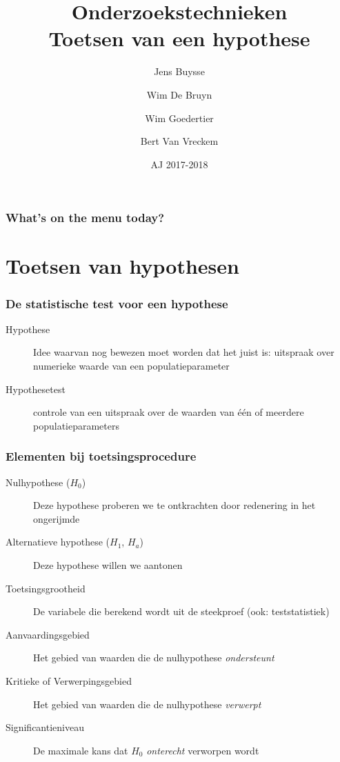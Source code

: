 \documentclass{beamer}
\title[Intro]{Onderzoekstechnieken\\Toetsen van een hypothese}
\author{Jens Buysse \and Wim {De Bruyn} \and Wim Goedertier \and Bert {Van Vreckem}}
\date{AJ 2017-2018}
\begin{document}

\HoGentLogo

\titleframe



\begin{frame}
  \frametitle{What's on the menu today?}

  \tableofcontents
\end{frame}

\section{Toetsen van hypothesen}
\sectionframelogo{}

\begin{frame}
  \frametitle{De statistische test voor een hypothese}

  \begin{description}
    \item[Hypothese] Idee waarvan nog bewezen moet worden dat het juist is: uitspraak over numerieke waarde van een populatieparameter
    \item[Hypothesetest] controle van een uitspraak over de waarden van één of meerdere populatieparameters
  \end{description}
\end{frame}

\begin{frame}
  \frametitle{Elementen bij toetsingsprocedure}

  \begin{description}
    \item[Nulhypothese ($H_0$)] Deze hypothese proberen we te ontkrachten door redenering in het ongerijmde
    \item[Alternatieve hypothese ($H_1$, $H_a$)] Deze hypothese willen we aantonen
    \item[Toetsingsgrootheid] De variabele die berekend wordt uit de steekproef (ook: teststatistiek)
    \item[Aanvaardingsgebied] Het gebied van waarden die de nulhypothese \emph{ondersteunt}
    \item[Kritieke of Verwerpingsgebied] Het gebied van waarden die de nulhypothese \emph{verwerpt}
    \item[Significantieniveau] De maximale kans dat $H_0$ \emph{onterecht} verworpen wordt
  \end{description}
\end{frame}
\end{document}
